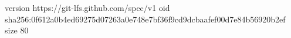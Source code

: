 version https://git-lfs.github.com/spec/v1
oid sha256:0f612a0b4ed69275d07263a0e748e7bf36f9cd9dcbaafef00d7e84b56920b2ef
size 80
